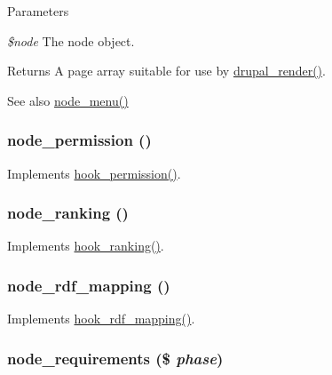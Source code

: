 \begin{DoxyParams}{Parameters}
\item[{\em \$node}]The node object.\end{DoxyParams}
\begin{DoxyReturn}{Returns}
A page array suitable for use by \hyperlink{common_8inc_a05798b44e8d6c496d4bee5cc32fa7851}{drupal\_\-render()}.
\end{DoxyReturn}
\begin{DoxySeeAlso}{See also}
\hyperlink{node_8module_a15e8d85a7559f22b8f2c77c1d5dfac63}{node\_\-menu()} 
\end{DoxySeeAlso}
\hypertarget{node_8module_a13de7a5099581f4a40ab82c52d632c68}{
\subsubsection[{node\_\-permission}]{\setlength{\rightskip}{0pt plus 5cm}node\_\-permission ()}}
\label{node_8module_a13de7a5099581f4a40ab82c52d632c68}
Implements \hyperlink{group__hooks_ga2b22b45f4925f2478412477bae329713}{hook\_\-permission()}. \hypertarget{node_8module_ae82543a4b619eb30da1ac2bbb3bd2842}{
\subsubsection[{node\_\-ranking}]{\setlength{\rightskip}{0pt plus 5cm}node\_\-ranking ()}}
\label{node_8module_ae82543a4b619eb30da1ac2bbb3bd2842}
Implements \hyperlink{group__node__api__hooks_gaf7a28ce3230dc96833ea5338fd26f43c}{hook\_\-ranking()}. \hypertarget{node_8module_a3e5e89ef9ef3f9f5ea3772b0c75c4ac1}{
\subsubsection[{node\_\-rdf\_\-mapping}]{\setlength{\rightskip}{0pt plus 5cm}node\_\-rdf\_\-mapping ()}}
\label{node_8module_a3e5e89ef9ef3f9f5ea3772b0c75c4ac1}
Implements \hyperlink{group__rdf_gae3e7f047bdcb9309b323e2af09966765}{hook\_\-rdf\_\-mapping()}. \hypertarget{node_8module_a69330298fa1d167f0cfaec1cea81f0dd}{
\subsubsection[{node\_\-requirements}]{\setlength{\rightskip}{0pt plus 5cm}node\_\-requirements (\$ {\em phase})}}
